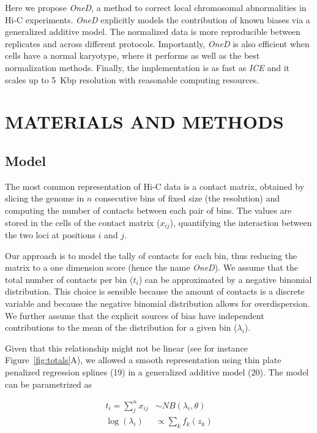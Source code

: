 \documentclass[a4,center,fleqn]{NAR}
\providecommand{\DIFadd}[1]{{\protect\color{red}#1}} %
\providecommand{\DIFdel}[1]{{\protect}}                      %
\providecommand{\DIFaddbegin}{} %
\providecommand{\DIFaddend}{} %
\providecommand{\DIFdelbegin}{} %
\providecommand{\DIFdelend}{} %
\begin{document}
Here we propose \textit{OneD}, a method to correct local chromosomal
abnormalities in Hi-C experiments. \textit{OneD} explicitly models the
contribution of known biases via a generalized additive model. The
normalized data is more reproducible between replicates and across
different protocols. Importantly, \textit{OneD} is also efficient when
cells have a normal karyotype, where it performs as well as the best
normalization methods. Finally, the implementation is as fast as
\textit{ICE} and it scales up to \DIFdelbegin \DIFdel{1~kbp }\DIFdelend \DIFaddbegin \DIFadd{5~Kbp }\DIFaddend resolution with reasonable
computing resources.


\section{MATERIALS AND METHODS}

\subsection{Model}
\DIFdelbegin %
\DIFdelend 

The most common representation of Hi-C data is a contact matrix, obtained
by slicing the genome in $n$ consecutive bins of fixed size (the
resolution) and computing the number of contacts between each pair of
bins. The values are stored in the cells of the contact matrix ($x_{ij}$),
quantifying the interaction between the two loci at positions $i$ and
$j$.

Our approach is to model the tally of contacts for each bin, thus reducing
the matrix to a one dimension score (hence the name \textit{OneD}). We
assume that the total number of contacts per bin ($t_{i}$) can be
approximated by a negative binomial distribution. This choice is sensible
because the amount of contacts is a discrete variable and because the
negative binomial distribution allows for overdispersion. We further
assume that the explicit sources of bias have independent contributions to
the mean of the distribution for a given bin ($\lambda_i$).

Given that this relationship might not be linear (see for instance
Figure~\ref{fig:totals}A), we allowed a smooth representation
using thin plate penalized regression splines (19) in a
generalized additive model (20). The model can be
parametrized as

\begin{align*}
t_i = \sum_j^n{x_{ij}} &\sim  NB(\lambda_i, \theta) \\
\log(\lambda_i) &\propto \sum_{k}{f_k(z_k)}
\end{align*}
\end{document}
